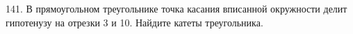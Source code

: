 141. В прямоугольном треугольнике точка касания вписанной окружности делит гипотенузу на отрезки 3 и 10. Найдите катеты треугольника.\\
